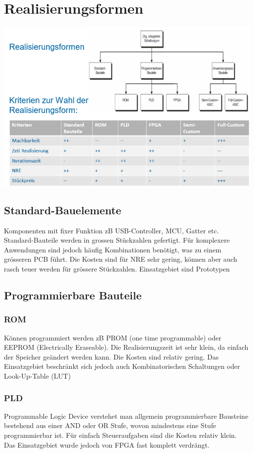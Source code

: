 \section{Realisierungsformen}
\begin{center}
	\includegraphics[width=\columnwidth]{Images/realisierungsformen}
\end{center}

\subsection{Standard-Bauelemente}
Komponenten mit fixer Funktion zB USB-Controller, MCU, Gatter etc. Standard-Bauteile werden in grossen Stückzahlen gefertigt. Für komplexere Anwendungen sind jedoch häufig Kombinationen benötigt, was zu einem grösseren PCB führt. Die Kosten sind für NRE sehr gering, können aber auch rasch teuer werden für grössere Stückzahlen. Einsatzgebiet sind Prototypen

\subsection{Programmierbare Bauteile}
\subsubsection{ROM}
Können programmiert werden zB PROM (one time programmable) oder EEPROM (Electrically Eraseable). Die Realisierungszeit ist sehr klein, da einfach der Speicher geändert werden kann. Die Kosten sind relativ gering. Das Einsatzgebiet beschränkt sich jedoch auch Kombinatorischen Schaltungen oder Look-Up-Table (LUT)

\subsubsection{PLD}
Programmable Logic Device verstehet man allgemein programmierbare Bausteine bestehend aus einer AND oder OR Stufe, wovon mindestens eine Stufe programmierbar ist. Für einfach Steueraufgaben sind die Kosten relativ klein. Das Einsatzgebiet wurde jedoch von FPGA fast komplett verdrängt.

